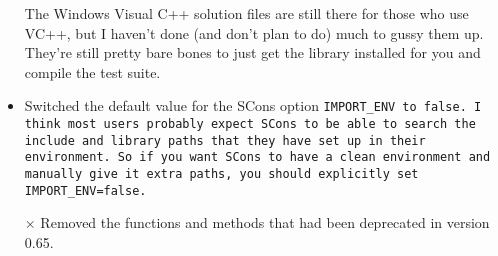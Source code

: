 \begin{itemize}
The Windows Visual C++ solution files are still there for those who use VC++,
but I haven't done (and don't plan to do) much to gussy them up.  They're
still pretty bare bones to just get the library installed for you and
compile the test suite.

\item
Switched the default value for the SCons option \tt{IMPORT\_ENV} to \tt{false}.
I think most users probably expect SCons to be able to search the include 
and library paths that they have set up in their environment.  So if
you want SCons to have a clean environment and manually give it extra
paths, you should explicitly set \tt{IMPORT\_ENV=false}.

\item[$\times$]
Removed the functions and methods that had been deprecated in version 0.65.


\end{itemize}
